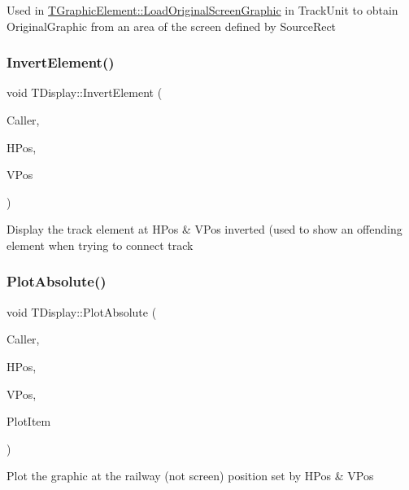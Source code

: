 Used in \mbox{\hyperlink{class_t_graphic_element_ac12f60cb52eefdc86eaa504419eb138d}{T\+Graphic\+Element\+::\+Load\+Original\+Screen\+Graphic}} in Track\+Unit to obtain Original\+Graphic from an area of the screen defined by Source\+Rect \mbox{\label{class_t_display_a63930b93b9883463cd9d779e86fefba2}} 
\subsubsection{\texorpdfstring{Invert\+Element()}{InvertElement()}}
{\footnotesize\ttfamily void T\+Display\+::\+Invert\+Element (\begin{DoxyParamCaption}\item[{int}]{Caller,  }\item[{int}]{H\+Pos,  }\item[{int}]{V\+Pos }\end{DoxyParamCaption})}

Display the track element at H\+Pos \& V\+Pos inverted (used to show an offending element when trying to connect track \mbox{\label{class_t_display_a7dae1c6470743a7cb778a6f813c7f0cc}} 
\subsubsection{\texorpdfstring{Plot\+Absolute()}{PlotAbsolute()}}
{\footnotesize\ttfamily void T\+Display\+::\+Plot\+Absolute (\begin{DoxyParamCaption}\item[{int}]{Caller,  }\item[{int}]{H\+Pos,  }\item[{int}]{V\+Pos,  }\item[{Graphics\+::\+T\+Bitmap $\ast$}]{Plot\+Item }\end{DoxyParamCaption})}

Plot the graphic at the railway (not screen) position set by H\+Pos \& V\+Pos \mbox{\label{class_t_display_aab35e517eba56f1c95f500958ce431ae}} 
